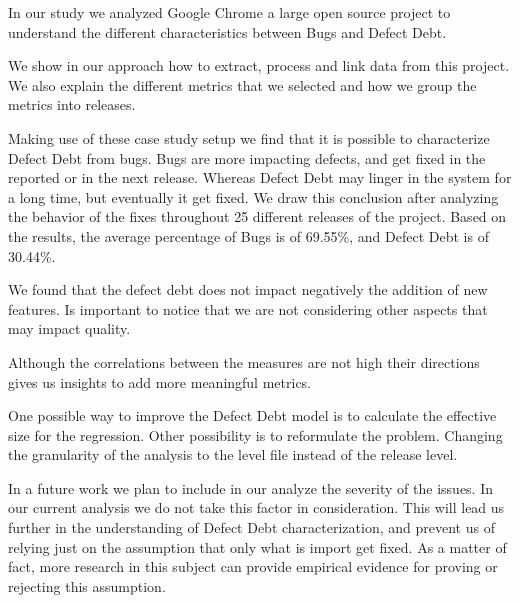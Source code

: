In our study we analyzed Google Chrome a large open source project to understand the different characteristics between Bugs and Defect Debt. 

We show in our approach how to extract, process and link data from this project. We also explain the different metrics that we selected and how we group the metrics into releases. 

Making use of these case study setup we find that it is possible to characterize Defect Debt from bugs. Bugs are more impacting defects, and get fixed in the reported or in the next release. Whereas Defect Debt may linger in the system for a long time, but eventually it get fixed. We draw this conclusion after analyzing the behavior of the fixes throughout 25 different releases of the project. Based on the results, the average percentage of Bugs is of 69.55\%, and Defect Debt is of 30.44\%.

We found that the defect debt does not impact negatively the addition of new features. Is important to notice that we are not considering other aspects that may impact quality.  

Although the correlations between the measures are not high their directions gives us insights to add more meaningful metrics.

One possible way to improve the Defect Debt model is to calculate the effective size for the regression. Other possibility is to reformulate the problem. Changing the granularity of the analysis to the level file instead of the release level. 

In a future work we plan to include in our analyze the severity of the issues. In our current analysis we do not take this factor in consideration. This will lead us further in the understanding of Defect Debt characterization, and prevent us of relying just on the assumption that only what is import get fixed. As a matter of fact, more research in this subject can provide empirical evidence for proving or rejecting this assumption.